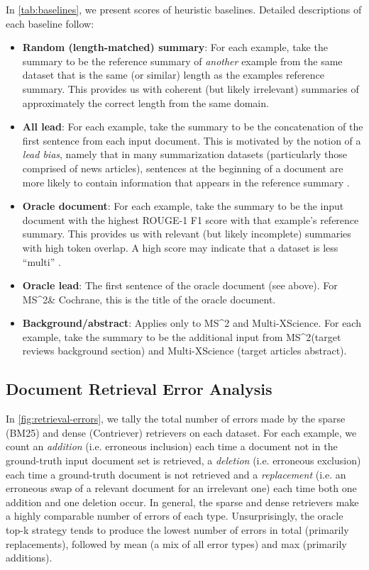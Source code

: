 \documentclass[11pt]{article}
\newcommand\mstoo{{MS\^{}2}\xspace}
\begin{document}
In \autoref{tab:baselines}, we present scores of heuristic baselines. Detailed descriptions of each baseline follow:

\begin{itemize}
    \item \textbf{Random (length-matched) summary}: For each example, take the summary to be the reference summary of \textit{another} example from the same dataset that is the same (or similar) length as the examples reference summary. This provides us with coherent (but likely irrelevant) summaries of approximately the correct length from the same domain.
    \item \textbf{All lead}: For each example, take the summary to be the concatenation of the first sentence from each input document. This is motivated by the notion of a \textit{lead bias}, namely that in many summarization datasets (particularly those comprised of news articles), sentences at the beginning of a document are more likely to contain information that appears in the reference summary \citep{nenkova-etal-2011-automatic, hong-nenkova-2014-improving, xing-etal-2021-demoting}.
    \item \textbf{Oracle document}: For each example, take the summary to be the input document with the highest ROUGE-1 F1 score with that example's reference summary. This provides us with relevant (but likely incomplete) summaries with high token overlap. A high score may indicate that a dataset is less ``multi'' \citep{https://doi.org/10.48550/arxiv.2210.12688}.
    \item \textbf{Oracle lead}: The first sentence of the oracle document (see above). For \mstoo \& Cochrane, this is the title of the oracle document.
    \item \textbf{Background/abstract}: Applies only to \mstoo and Multi-XScience. For each example, take the summary to be the additional input from \mstoo (target reviews background section) and Multi-XScience (target articles abstract).
\end{itemize}

\subsection{Document Retrieval Error Analysis}
\label{appendix:retrieval-error-analysis}

In \autoref{fig:retrieval-errors}, we tally the total number of errors made by the sparse (BM25) and dense (Contriever) retrievers on each dataset. For each example, we count an \textit{addition} (i.e. erroneous inclusion) each time a document not in the ground-truth input document set is retrieved, a \textit{deletion} (i.e. erroneous exclusion) each time a ground-truth document is not retrieved and a \textit{replacement} (i.e. an erroneous swap of a relevant document for an irrelevant one) each time both one addition and one deletion occur. In general, the sparse and dense retrievers make a highly comparable number of errors of each type. Unsurprisingly, the oracle top-k strategy tends to produce the lowest number of errors in total (primarily replacements), followed by mean (a mix of all error types) and max (primarily additions).
\end{document}
